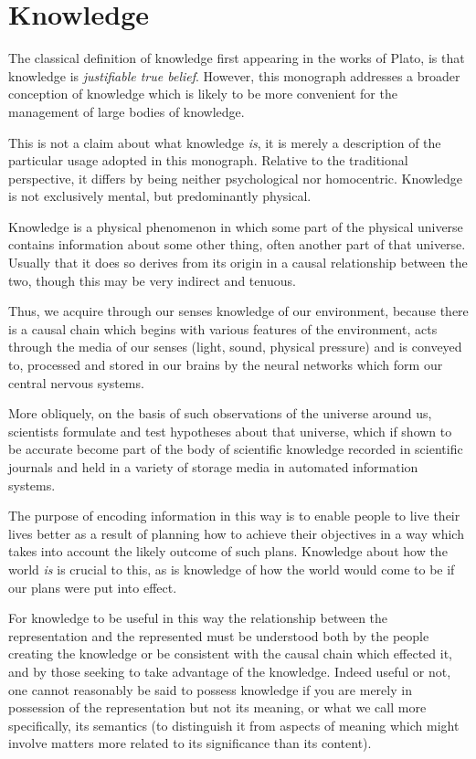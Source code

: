 \section{Knowledge}

The classical definition of knowledge first appearing in the works of Plato, is that knowledge is \emph{justifiable true belief}.
However, this monograph addresses a broader conception of knowledge which is likely to be more convenient for the management of large bodies of knowledge.

This is not a claim about what knowledge \emph{is}, it is merely a description of the particular usage adopted in this monograph.
Relative to the traditional perspective, it differs by being neither psychological nor homocentric.
Knowledge is not exclusively mental, but predominantly physical.

Knowledge is a physical phenomenon in which some part of the physical universe contains information about some other thing, often another part of that universe.
Usually that it does so derives from its origin in a causal relationship between the two, though this may be very indirect and tenuous.

Thus, we acquire through our senses knowledge of our environment, because there is a causal chain which begins with various features of the environment, acts through the media of our senses (light, sound, physical pressure) and is conveyed to, processed and stored in our brains by the neural networks which form our central nervous systems.

More obliquely, on the basis of such observations of the universe around us, scientists formulate and test hypotheses about that universe, which if shown to be accurate become part of the body of scientific knowledge recorded in scientific journals and held in a variety of storage media in automated information systems.

The purpose of encoding information in this way is to enable people to live their lives better as a result of planning how to achieve their objectives in a way which takes into account the likely outcome of such plans.
Knowledge about how the world \emph{is} is crucial to this, as is knowledge of how the world would come to be if our plans were put into effect.

For knowledge to be useful in this way the relationship between the representation and the represented must be understood both by the people creating the knowledge or be consistent with the causal chain which effected it, and by those seeking to take advantage of the knowledge.
Indeed useful or not, one cannot reasonably be said to possess knowledge if you are merely in possession of the representation but not its meaning, or what we call more specifically, its semantics (to distinguish it from aspects of meaning which might involve matters more related to its significance than its content).

